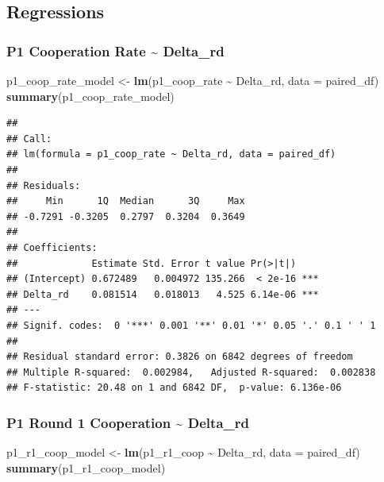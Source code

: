 \documentclass[
]{article}
\newenvironment{Shaded}{\begin{snugshade}}{\end{snugshade}}
\newcommand{\AttributeTok}[1]{\textcolor[rgb]{0.13,0.29,0.53}{#1}}
\newcommand{\FunctionTok}[1]{\textcolor[rgb]{0.13,0.29,0.53}{\textbf{#1}}}
\newcommand{\NormalTok}[1]{#1}
\newcommand{\OtherTok}[1]{\textcolor[rgb]{0.56,0.35,0.01}{#1}}
\newcommand{\SpecialCharTok}[1]{\textcolor[rgb]{0.81,0.36,0.00}{\textbf{#1}}}
\begin{document}
\subsection{Regressions}\label{regressions}

\subsubsection{P1 Cooperation Rate \textasciitilde{}
Delta\_rd}\label{p1-cooperation-rate-delta_rd}

\begin{Shaded}
\begin{Highlighting}[]
\NormalTok{p1\_coop\_rate\_model }\OtherTok{\textless{}{-}} \FunctionTok{lm}\NormalTok{(p1\_coop\_rate }\SpecialCharTok{\textasciitilde{}}\NormalTok{ Delta\_rd, }\AttributeTok{data =}\NormalTok{ paired\_df)}
\FunctionTok{summary}\NormalTok{(p1\_coop\_rate\_model)}
\end{Highlighting}
\end{Shaded}

\begin{verbatim}
## 
## Call:
## lm(formula = p1_coop_rate ~ Delta_rd, data = paired_df)
## 
## Residuals:
##     Min      1Q  Median      3Q     Max 
## -0.7291 -0.3205  0.2797  0.3204  0.3649 
## 
## Coefficients:
##             Estimate Std. Error t value Pr(>|t|)    
## (Intercept) 0.672489   0.004972 135.266  < 2e-16 ***
## Delta_rd    0.081514   0.018013   4.525 6.14e-06 ***
## ---
## Signif. codes:  0 '***' 0.001 '**' 0.01 '*' 0.05 '.' 0.1 ' ' 1
## 
## Residual standard error: 0.3826 on 6842 degrees of freedom
## Multiple R-squared:  0.002984,   Adjusted R-squared:  0.002838 
## F-statistic: 20.48 on 1 and 6842 DF,  p-value: 6.136e-06
\end{verbatim}

\subsubsection{P1 Round 1 Cooperation \textasciitilde{}
Delta\_rd}\label{p1-round-1-cooperation-delta_rd}

\begin{Shaded}
\begin{Highlighting}[]
\NormalTok{p1\_r1\_coop\_model }\OtherTok{\textless{}{-}} \FunctionTok{lm}\NormalTok{(p1\_r1\_coop }\SpecialCharTok{\textasciitilde{}}\NormalTok{ Delta\_rd, }\AttributeTok{data =}\NormalTok{ paired\_df)}
\FunctionTok{summary}\NormalTok{(p1\_r1\_coop\_model)}
\end{Highlighting}
\end{Shaded}
\end{document}
